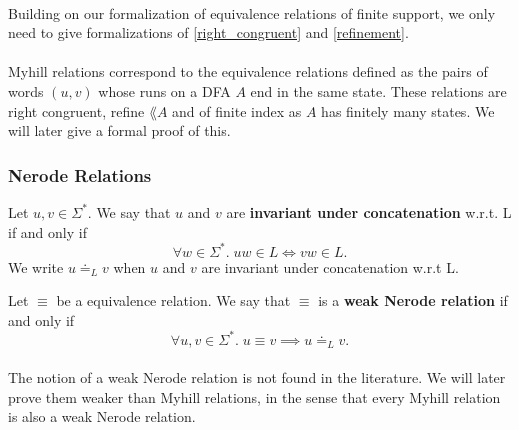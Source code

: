 \paragraph{}
Building on our formalization of equivalence relations of finite support, 
we only need to give formalizations of \ref{right_congruent} and \ref{refinement}.


\paragraph{}
Myhill relations correspond to the equivalence relations 
defined as the pairs of words $(u, v)$ whose runs on a DFA $A$ end in the same state. 
These relations are right congruent, refine $\lang{A}$ and of finite index as $A$ has finitely many states. 
We will later give a formal proof of this.

\subsubsection{Nerode Relations}

\begin{definition}
    \label{equal_suffix}
    Let $u, v \in \Sigma^*$. We say that $u$ and $v$ are \textbf{invariant under concatenation} w.r.t. L if and only if
    \begin{equation*}
        \forall w \in \Sigma^*. \; uw \in L \Leftrightarrow vw \in L. 
    \end{equation*}
    We write $u \doteq_L v$ when $u$ and $v$ are invariant under concatenation w.r.t L.
\end{definition}

\begin{definition}
    \label{Weak_Nerode_Rel}
    Let $\equiv$ be a equivalence relation. We say that $\equiv$ is a \textbf{weak Nerode relation} if and only if
    \begin{equation*}
        \forall u, v \in \Sigma^*. \; u \equiv v \implies u \doteq_L v.
    \end{equation*}
\end{definition}



\paragraph{}
The notion of a weak Nerode relation is not found in the literature.
We will later prove them weaker than Myhill relations, in the sense that every Myhill relation is also a weak Nerode relation.

